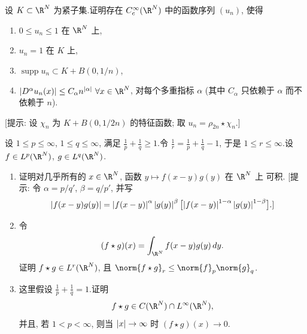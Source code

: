 \begin{exercise}
\label{exer:4.29}
设 $K\subset\R^N$ 为紧子集.证明存在 $C_c^\infty(\R^N)$ 中的函数序列 $(u_n)$,
使得
\begin{enumerate}[label=(\alph*), leftmargin=2.4em, itemsep=0.15em]
	\item $0\le u_n\le1$ 在 $\R^N$ 上,
	\item $u_n=1$ 在 $K$ 上,
	\item $\operatorname{supp}u_n\subset K+B(0,1/n)$,
	\item $\abs{D^\alpha u_n(x)}\le C_\alpha n^{\abs{\alpha}}\ \forall x\in\R^N$,
	      对每个多重指标 $\alpha$ (其中 $C_\alpha$ 只依赖于 $\alpha$ 而不依赖于
	      $n$).
\end{enumerate}
[提示: 设 $\chi_n$ 为 $K+B(0,1/2n)$ 的特征函数; 取
$u_n=\rho_{2n}\star\chi_n$.]
\end{exercise}

\begin{exercise}
\label{exer:4.30}
设 $1\le p\le\infty$, $1\le q\le\infty$, 满足 $\frac1p+\frac1q\ge1$.令
$\frac1r=\frac1p+\frac1q-1$, 于是 $1\le r\le\infty$.设
$f\in L^p(\R^N)$, $g\in L^q(\R^N)$.
\begin{enumerate}[label=\arabic*., leftmargin=2.2em, itemsep=0.35em]
	\item 证明对几乎所有的 $x\in\R^N$, 函数 $y\mapsto f(x-y)g(y)$ 在 $\R^N$ 上
	      可积.
	      [提示: 令 $\alpha=p/q'$, $\beta=q/p'$, 并写
	      \begin{equation*}
	      \left|f(x-y)g(y)\right|=\left|f(x-y)\right|^\alpha\left|g(y)\right|^\beta
	      \bigl[\left|f(x-y)\right|^{1-\alpha}\left|g(y)\right|^{1-\beta}\bigr].]
	      \end{equation*}
	\item 令
	      \begin{equation*}
	      (f\star g)(x)=\int_{\R^N}f(x-y)g(y)\,dy.
	      \end{equation*}
	      证明 $f\star g\in L^r(\R^N)$, 且 $\norm{f\star g}_r\le\norm{f}_p
	      \norm{g}_q$.
	\item 这里假设 $\frac1p+\frac1q=1$.证明
	      \begin{equation*}
	      f\star g\in C(\R^N)\cap L^\infty(\R^N),
	      \end{equation*}
	      并且, 若 $1<p<\infty$, 则当 $\left|x\right|\to\infty$ 时
	      $(f\star g)(x)\to0$.
\end{enumerate}
\end{exercise}

